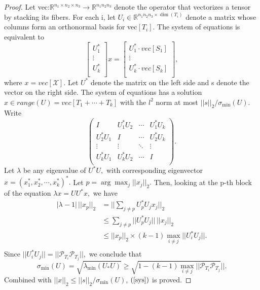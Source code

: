\documentclass[journal,transmag]{IEEEtran}
\theoremstyle{plain}
\begin{document}
\begin{proof}
Let vec:$\mathbb{R}^{n_1\times n_2\times n_3}\rightarrow \mathbb{R}^{n_1 n_2 n_3}$ denote the operator that vectorizes a tensor by stacking its fibers. For each i, let $U_i \in \mathbb{R}^{n_1 n_2 n_3 \times \dim(T_i)}$ denote a matrix whose columns form an orthonormal basis for vec$[T_i]$. The system of equations is equivalent to
\[ \left[
\begin{matrix}
U_1^* \\
\vdots \\
U_k^* \\
\end{matrix}
\right] x =
\left[
\begin{matrix}
U_1^*\cdot vec[S_1] \\
\vdots \\
U_k^*\cdot vec[S_k] \\
\end{matrix}
\right],
 \]
where $x = vec[\mathcal{X}].$ Let $U^*$ denote the matrix on the left side and s denote the vector on the right side. The system of equations has a solution $x \in range(U) = vec[T_1+\cdots+T_k]$ with the $l^2$ norm at most $||s||_2/\sigma_{\min}(U).$
Write
\[ \left(
 \begin{matrix}
   I & U_1^*U_2 & \cdots & U_1^*U_k \\
   U_2^*U_1 & I & \cdots & U_2^*U_k \\
   \vdots & \vdots &\ddots & \vdots \\
  U_k^*U_1 & U_k^*U_2 & \cdots & I \\
  \end{matrix}
 \right). \]
 Let $\lambda$ be any eigenvalue of $U^* U,$ with corresponding eigenvector $x = (x_1^*, x_2^*,\cdots,x_k^*)^*.$ Let $p = \arg\max_j ||x_j||_2.$ Then, looking at the p-th block of the equation $\lambda x =U U^* x,$ we have
 \begin{equation}
 \begin{split}
 |\lambda-1| \, ||x_p||_2 &=  ||\sum_{j\not=p}U_p^* U_j x_j||_2 \\
 & \le \sum_{j\not= p}||U_p^* U_j||\, ||x_j||_2 \\
 & \le ||x_p||_2 \times (k-1) \max_{i\not=j}||U_i^*U_j||. \\
 \end{split}
 \end{equation}
 Since $||U_i^* U_j|| = ||\mathcal{P}_{T_i}\mathcal{P}_{T_j}||,$ we conclude that
\begin{equation}
{\sigma_{\min}(U)
=\sqrt{\lambda_{\min}(U_*U)}
\ge \sqrt{1-(k-1)\max_{i\not=j}||\mathcal{P}_{T_i}\mathcal{P}_{T_j}}||. }
\end{equation}
Combined with $||x||_2 \le ||s||_2 /\sigma_{\min}(U)$, $(\ref{sys})$ is proved.
\end{proof}
\end{document}
